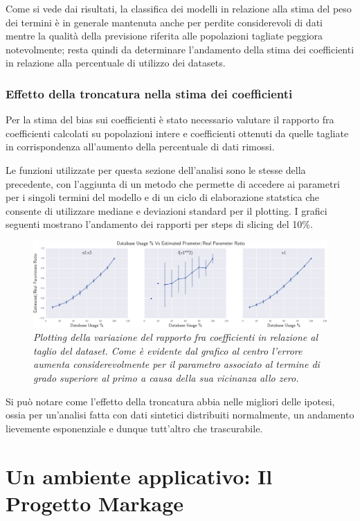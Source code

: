 \documentclass[a4paper]{report}
\begin{document}
Come si vede dai risultati, la classifica dei modelli in relazione alla stima del peso dei termini è in generale mantenuta anche per perdite considerevoli di dati mentre la qualità della previsione riferita alle popolazioni tagliate peggiora notevolmente; resta quindi da determinare l'andamento della stima dei coefficienti in relazione alla percentuale di utilizzo dei datasets.


\subsection{Effetto della troncatura nella stima dei coefficienti }

Per la stima del bias sui coefficienti è stato necessario valutare il rapporto fra coefficienti calcolati su popolazioni intere e coefficienti ottenuti da quelle  tagliate in corrispondenza all'aumento della percentuale di dati rimossi.

 Le funzioni utilizzate per questa sezione dell'analisi sono le stesse della precedente, con l'aggiunta di un metodo che permette di accedere ai parametri per i singoli termini del modello e di un ciclo di elaborazione statstica che consente  di utilizzare mediane e deviazioni standard per il plotting.
I grafici seguenti mostrano l'andamento dei rapporti per steps di slicing del 10\%.

\begin{figure}[hbtp]
\includegraphics[width=\textwidth]{finalgraph}
\caption{\textit{Plotting della variazione del rapporto fra coefficienti in relazione al taglio del dataset. Come è evidente dal grafico al centro l'errore aumenta considerevolmente per il parametro associato al termine di grado superiore al primo a causa della sua vicinanza allo zero.}}
\end{figure}


Si può notare come l'effetto della troncatura abbia nelle migliori delle ipotesi, ossia per un'analisi fatta con dati sintetici distribuiti normalmente, un andamento lievemente esponenziale e dunque tutt'altro che trascurabile.

\chapter{Un ambiente applicativo: Il Progetto Markage}
\end{document}
